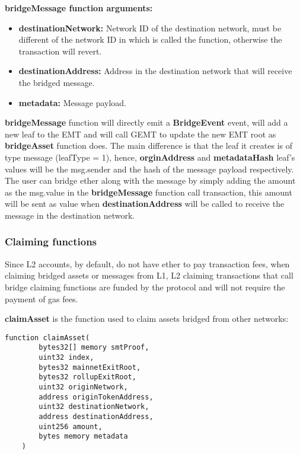 \textbf{bridgeMessage function arguments:}

\begin{itemize}
	\item \textbf{destinationNetwork:} Network ID of the destination network, must be different of the network ID in which is called the function, otherwise the transaction will revert.
	\item \textbf{destinationAddress:} Address in the destination network that will receive the bridged message.
	\item \textbf{metadata:} Message payload.
\end{itemize}

\textbf{bridgeMessage} function will directly emit a \textbf{BridgeEvent} event, will add a new leaf to the EMT and will call GEMT to update the new EMT root as \textbf{bridgeAsset} function does. The main difference is that the leaf it creates is of type message (leafType = 1), hence, \textbf{orginAddress} and \textbf{metadataHash} leaf's values will be the msg.sender and the hash of the message payload respectively. The user can bridge ether along with the message by simply adding the amount as the msg.value in the \textbf{bridgeMessage} function call transaction, this amount will be sent as value when \textbf{destinationAddress} will be called to receive the message in the destination network.

\subsubsection{Claiming functions}

Since L2 accounts, by default, do not have ether to pay transaction fees, when claiming bridged assets or messages from L1, L2 claiming transactions that call bridge claiming functions are funded by the protocol and will not require the payment of gas fees.

\textbf{claimAsset} is the function used to claim assets bridged from other networks:

\begin{lstlisting}[language=solidity]
	function claimAsset(
        bytes32[] memory smtProof,
        uint32 index,
        bytes32 mainnetExitRoot,
        bytes32 rollupExitRoot,
        uint32 originNetwork,
        address originTokenAddress,
        uint32 destinationNetwork,
        address destinationAddress,
        uint256 amount,
        bytes memory metadata
    )
\end{lstlisting}

